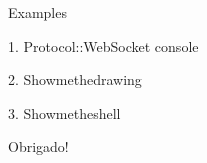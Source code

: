 \documentclass[14pt]{beamer}
\begin{document}
\begin{frame}
    \begin{center}
    Examples
    \end{center}
\end{frame}

\begin{frame}
    \begin{center}
    1. Protocol::WebSocket console
    \end{center}
\end{frame}

\begin{frame}
    \begin{center}
    2. Showmethedrawing
    \end{center}
\end{frame}

\begin{frame}
    \begin{center}
    3. Showmetheshell
    \end{center}
\end{frame}

\begin{frame}
    \begin{center}
    Obrigado!
    \end{center}
\end{frame}
\end{document}
